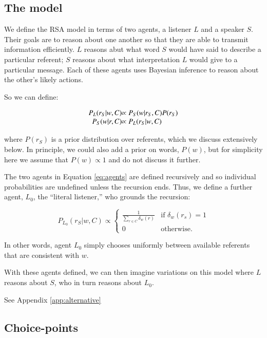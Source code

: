 \subsection{The model}

We define the RSA model in terms of two agents, a listener $L$ and a speaker $S$. Their goals are to reason about one another so that they are able to transmit information efficiently. $L$ reasons abut what word $S$ would have said to describe a particular referent; $S$ reasons about what interpretation $L$ would give to a particular message. Each of these agents uses Bayesian inference to reason about the other's likely actions. 

So we can define:

\begin{equation}
  \begin{array}{r@{}l}
    \label{eq:agents}
    P_L(r_S | w, C) & \propto P_S (w | r_S, C) P(r_S)\\
    P_S(w | r, C) & \propto P_L (r_S | w, C)  
  \end{array}
\end{equation}

\noindent where $P(r_S)$ is a prior distribution over referents, which we discuss extensively below. In principle, we could also add a prior on words, $P(w)$, but for simplicity here we assume that $P(w) \propto 1$ and do not discuss it further. 

The two agents in Equation \ref{eq:agents} are defined recursively and so individual probabilities are undefined unless the recursion ends. Thus, we define a further agent, $L_0$, the ``literal listener,'' who grounds the recursion:

\begin{equation}
P_{L_0} (r_S | w, C) \propto \begin{cases} \frac{1}{\sum_{r \in C} \delta_w(r)} &\mbox{if } \delta_w(r_s) = 1 \\ 
0 & \mbox{otherwise.} \end{cases} 
\end{equation}

\noindent In other words, agent $L_0$ simply chooses uniformly between available referents that are consistent with $w$. 

With these agents defined, we can then imagine variations on this model where $L$ reasons about $S$, who in turn reasons about $L_0$. 

See Appendix \ref{app:alternative}

\subsection{Choice-points}

